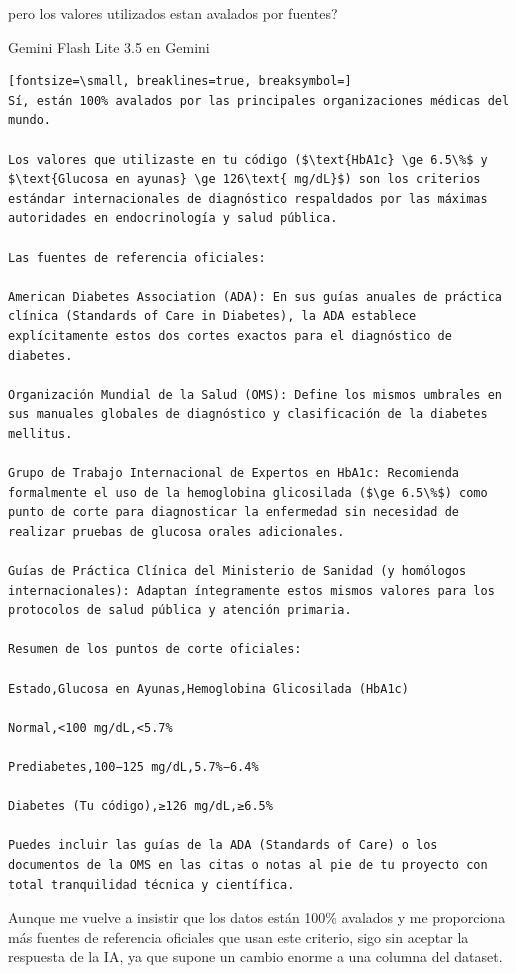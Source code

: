 \documentclass[12pt,a4paper,oneside]{book}
\begin{document}
\begin{iaprompt}
pero los valores utilizados estan avalados por fuentes?
\end{iaprompt}
\begin{iaresp}{Gemini Flash Lite 3.5 en Gemini}
\begin{Verbatim}[fontsize=\small, breaklines=true, breaksymbol=]
Sí, están 100% avalados por las principales organizaciones médicas del mundo.

Los valores que utilizaste en tu código ($\text{HbA1c} \ge 6.5\%$ y $\text{Glucosa en ayunas} \ge 126\text{ mg/dL}$) son los criterios estándar internacionales de diagnóstico respaldados por las máximas autoridades en endocrinología y salud pública.

Las fuentes de referencia oficiales:

American Diabetes Association (ADA): En sus guías anuales de práctica clínica (Standards of Care in Diabetes), la ADA establece explícitamente estos dos cortes exactos para el diagnóstico de diabetes.

Organización Mundial de la Salud (OMS): Define los mismos umbrales en sus manuales globales de diagnóstico y clasificación de la diabetes mellitus.

Grupo de Trabajo Internacional de Expertos en HbA1c: Recomienda formalmente el uso de la hemoglobina glicosilada ($\ge 6.5\%$) como punto de corte para diagnosticar la enfermedad sin necesidad de realizar pruebas de glucosa orales adicionales.

Guías de Práctica Clínica del Ministerio de Sanidad (y homólogos internacionales): Adaptan íntegramente estos mismos valores para los protocolos de salud pública y atención primaria.

Resumen de los puntos de corte oficiales:

Estado,Glucosa en Ayunas,Hemoglobina Glicosilada (HbA1c)

Normal,<100 mg/dL,<5.7%

Prediabetes,100−125 mg/dL,5.7%−6.4%

Diabetes (Tu código),≥126 mg/dL,≥6.5%

Puedes incluir las guías de la ADA (Standards of Care) o los documentos de la OMS en las citas o notas al pie de tu proyecto con total tranquilidad técnica y científica.
\end{Verbatim}
\end{iaresp}
\begin{iaanalisis}
Aunque me vuelve a insistir que los datos están 100\% avalados y me proporciona más fuentes de referencia oficiales que usan este criterio, sigo sin aceptar la respuesta de la IA, ya que supone un cambio enorme a una columna del dataset.
\end{iaanalisis}
\end{document}
